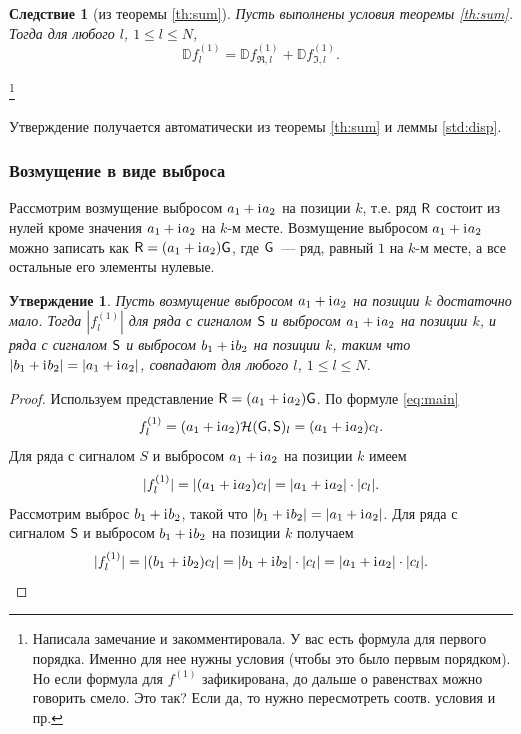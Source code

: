 \documentclass[specialist,
               substylefile = spbu.rtx,
               subf,href,colorlinks=true, 12pt]{disser}
\newtheorem{statement}{Утверждение}
\newtheorem{corollary}{Следствие}
\begin{document}
\begin{corollary}[из теоремы {\ref{th:sum}}] \label{st:dispsum}
	Пусть выполнены условия теоремы \ref{th:sum}.
	Тогда для любого $l$, $1\le l \le N$,
	\begin{equation} \label{eq:dispsum}
		\mathbb{D}f^{(1)}_l = \mathbb{D}f^{(1)}_{\Re, l} + \mathbb{D}f^{(1)}_{\Im, l}.	
	\end{equation}
\end{corollary}
\footnote{Написала замечание и закомментировала. У вас есть формула для первого порядка. Именно для нее нужны условия (чтобы это было первым порядком). Но если формула для $f^{(1)}$ зафикирована, до дальше о равенствах можно говорить смело. Это так? Если да, то нужно пересмотреть соотв. условия  и пр.}

Утверждение получается автоматически из теоремы \ref{th:sum} и леммы \ref{std:disp}.

\subsubsection{Возмущение в виде выброса} \label{ss:RMSEinv}

Рассмотрим возмущение выбросом $a_1 + \mathrm{i}\mkern1mu a_2$ на позиции $k$, т.е. ряд $\textsf{R}$ состоит из нулей кроме значения $a_1 + \mathrm{i}\mkern1mu a_2$ на $k$-м месте.
Возмущение выбросом $a_1 + \mathrm{i}\mkern1mu a_2$ можно записать как  $\textsf{R} = (a_1 + \mathrm{i}\mkern1mu a_2)\textsf{G}$, где $\textsf{G}$~--- ряд, равный $1$ на $k$-м месте, а все остальные его элементы нулевые.

\begin{statement}\label{st:RMSEinv}
	Пусть возмущение выбросом $a_1 + \mathrm{i}\mkern1mu a_2$ на позиции $k$ достаточно мало.
	Тогда $|f_l^{(1)}|$ для ряда с сигналом $\textsf{S}$ и выбросом $a_1 + \mathrm{i}\mkern1mu a_2$ на позиции $k$, и  ряда с сигналом $\textsf{S}$ и выбросом $b_1 + \mathrm{i}\mkern1mu b_2$ на позиции $k$, таким что $|b_1 + \mathrm{i}\mkern1mu b_2| = |a_1 + \mathrm{i}\mkern1mu a_2|$, совпадают для любого $l$, $1\le l \le N$.
\end{statement}
\begin{proof}
	Используем представление $\textsf{R} = (a_1 + \mathrm{i}\mkern1mu a_2)\textsf{G}$.
	По формуле \eqref{eq:main}
	$$f^{(1)}_l = (a_1 + \mathrm{i}\mkern1mu a_2)\mathcal{H}(\textsf{G}, \textsf{S})_l = (a_1 + \mathrm{i}\mkern1mu a_2)c_l.$$
	Для ряда с сигналом $S$ и выбросом $a_1 + \mathrm{i}\mkern1mu a_2$ на позиции $k$ имеем
	$$|f^{(1)}_l| = |(a_1 + \mathrm{i}\mkern1mu a_2)c_l| = |a_1 + \mathrm{i}\mkern1mu a_2|\cdot|c_l|. $$
	Рассмотрим выброс $b_1 + \mathrm{i}\mkern1mu b_2$, такой что $|b_1 + \mathrm{i}\mkern1mu b_2| = |a_1 + \mathrm{i}\mkern1mu a_2|$.
	Для ряда с сигналом $\textsf{S}$ и выбросом $b_1 + \mathrm{i}\mkern1mu b_2$ на позиции $k$ получаем
	$$|f^{(1)}_l| = |(b_1 + \mathrm{i}\mkern1mu b_2)c_l| = |b_1 + \mathrm{i}\mkern1mu b_2|\cdot|c_l| = |a_1 + \mathrm{i}\mkern1mu a_2|\cdot|c_l|. $$
\end{proof}
\end{document}
